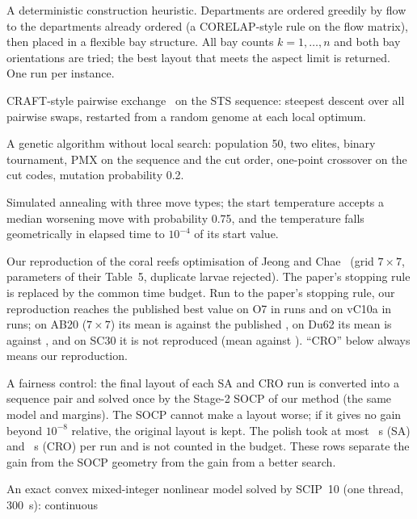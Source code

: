 \begin{description}[leftmargin=0pt]
\item[Construct.] A deterministic construction heuristic. Departments are ordered greedily by flow to the
departments already ordered (a CORELAP-style rule on the flow matrix), then placed in a flexible bay
structure. All bay counts $k=1,\dots,n$ and both bay orientations are tried; the best layout that meets the
aspect limit is returned. One run per instance.
\item[Swap.] CRAFT-style pairwise exchange~\cite{armour1963} on the STS sequence: steepest descent over all
pairwise swaps, restarted from a random genome at each local optimum.
\item[GA.] A genetic algorithm without local search: population 50, two elites, binary tournament, PMX on
the sequence and the cut order, one-point crossover on the cut codes, mutation probability 0.2.
\item[SA.] Simulated annealing with three move types; the start temperature accepts a median worsening move
with probability 0.75, and the temperature falls geometrically in elapsed time to $10^{-4}$ of its start value.
\item[CRO.] Our reproduction of the coral reefs optimisation of Jeong and Chae~\cite{jeong2026} (grid
$7\times7$, parameters of their Table~5, duplicate larvae rejected). The paper's stopping rule is replaced by the
common time budget. Run to the paper's stopping rule, our reproduction reaches the published best value on O7 in
\bxCroFullOsevenHits{} runs and on vC10a in \bxCroFullvCtenaHits{} runs; on AB20 ($7\times7$) its mean is
\bxCroFullOurMeanABtwenty{} against the published \bxCroFullPaperMeanABtwenty, on Du62 its mean is
\bxCroFullOurMeanDusixtytwo{} against \bxCroFullPaperMeanDusixtytwo, and on SC30 it is not reproduced
(mean \bxCroFullOurMeanSCthirty{} against \bxCroFullPaperMeanSCthirty). ``CRO'' below always means our
reproduction.
\item[SA + polish, CRO + polish.] A fairness control: the final layout of each SA and CRO run is converted
into a sequence pair and solved once by the Stage-2 SOCP of our method (the same model and margins). The SOCP
cannot make a layout worse; if it gives no gain beyond $10^{-8}$ relative, the original layout is kept. The polish
took at most \bxPolishTimeMaxSAPolish~s (SA) and \bxPolishTimeMaxCROPolish~s (CRO) per run and is not counted in
the budget. These rows separate the gain from the SOCP geometry from the gain from a better search.
\item[MINLP.] An exact convex mixed-integer nonlinear model solved by SCIP~10 (one thread, 300~s): continuous

\end{description}
